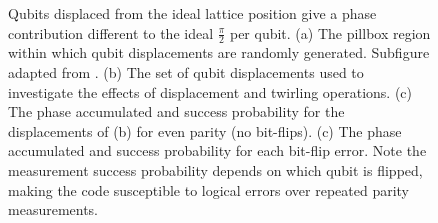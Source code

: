 \begin{figure}
	\caption{Qubits displaced from the ideal lattice position give a phase contribution different to the ideal $\tfrac{\pi}{2}$ per qubit. (a) The pillbox region within which qubit displacements are randomly generated. Subfigure adapted from \cite{OGorman2016}. (b) The set of qubit displacements used to investigate the effects of displacement and twirling operations. (c) The phase accumulated and success probability for the displacements of (b) for even parity (no bit-flips). (c) The phase accumulated and success probability for each bit-flip error. Note the measurement success probability depends on which qubit is flipped, making the code susceptible to logical errors over repeated parity measurements.}
\end{figure}





